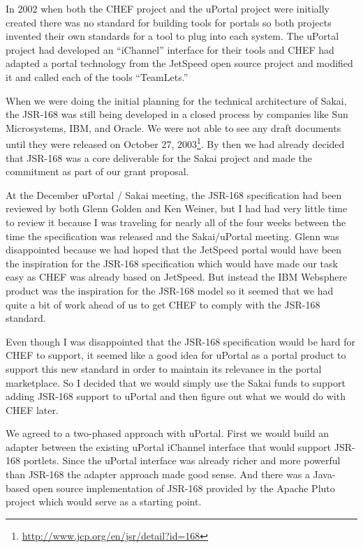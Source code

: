 \documentclass[12pt]{book}
\begin{document}
In 2002 when both the CHEF project and the uPortal project
were initially created there was no standard for building tools for portals
so both projects invented their own standards for a tool to plug into each system.
The uPortal project had developed an ``iChannel'' interface for their tools
and CHEF had adapted a portal technology from the JetSpeed open source project
and modified it and called each of the tools ``TeamLets.''

When we were doing the initial planning for the technical architecture
of Sakai, the JSR-168 was still being developed in a closed
process by companies like Sun Microsystems, IBM, and Oracle.
We were not able to see any draft documents
until they were released on October 27, 2003\footnote{\url{http://www.jcp.org/en/jsr/detail?id=168}}.
By then we had already decided that JSR-168 was a core deliverable
for the Sakai project and made the commitment as part of our grant proposal.

At the December uPortal / Sakai meeting, the JSR-168 specification had been
reviewed by both Glenn Golden
and Ken Weiner,
but I had had very little time to review it
because I was traveling for nearly all of the four weeks between the
time the specification was released and the Sakai\slash uPortal meeting.
Glenn was disappointed because we had hoped that the JetSpeed portal would
have been the inspiration for the JSR-168 specification which would have made
our task easy as CHEF was already based on JetSpeed.  But instead the
IBM Websphere product was the inspiration for the JSR-168 model so it seemed
that we had quite a bit of work ahead of us to get CHEF to comply with the
JSR-168 standard.

Even though I was disappointed that the JSR-168 specification would be hard
for CHEF to support, it seemed like a good idea for uPortal as a portal
product to support this new standard in order to maintain its relevance in
the portal marketplace.  So I decided that we would simply use the Sakai funds
to support adding JSR-168 support to uPortal and then figure out what we would
do with CHEF later.

We agreed to a two-phased approach with uPortal.  First we would build an adapter
between the existing uPortal iChannel interface that would support
JSR-168 portlets.  Since the uPortal interface was already richer and more powerful
than JSR-168 the adapter approach made good sense.  And there was a Java-based
open source implementation of JSR-168 provided by the Apache Pluto project which
would serve as a starting point.
\end{document}
